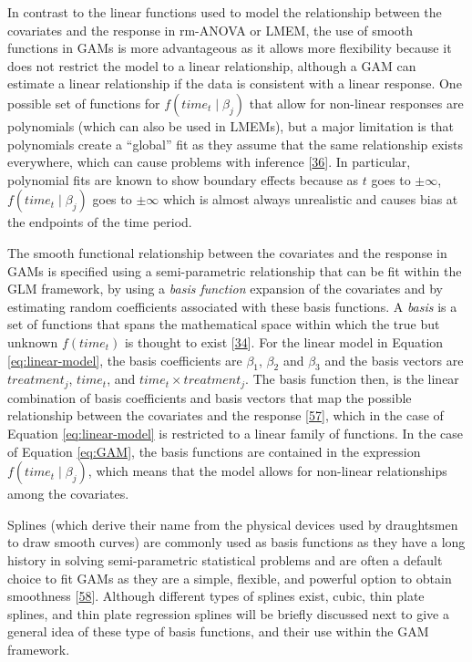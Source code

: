 \documentclass[
]{article}
\begin{document}
In contrast to the linear functions used to model the relationship between the covariates and the response in rm-ANOVA or LMEM, the use of smooth functions in GAMs is more advantageous as it allows more flexibility because it does not restrict the model to a linear relationship, although a GAM can estimate a linear relationship if the data is consistent with a linear response. One possible set of functions for \(f(time_t\mid \beta_j)\) that allow for non-linear responses are polynomials (which can also be used in LMEMs), but a major limitation is that polynomials create a ``global'' fit as they assume that the same relationship exists everywhere, which can cause problems with inference {[}\protect\hyperlink{ref-beck1998}{36}{]}. In particular, polynomial fits are known to show boundary effects because as \(t\) goes to \(\pm \infty\), \(f(time_t \mid \beta_j)\) goes to \(\pm \infty\) which is almost always unrealistic and causes bias at the endpoints of the time period.

The smooth functional relationship between the covariates and the response in GAMs is specified using a semi-parametric relationship that can be fit within the GLM framework, by using a \emph{basis function} expansion of the covariates and by estimating random coefficients associated with these basis functions. A \emph{basis} is a set of functions that spans the mathematical space within which the true but unknown \(f(time_t)\) is thought to exist {[}\protect\hyperlink{ref-simpson2018}{34}{]}. For the linear model in Equation \eqref{eq:linear-model}, the basis coefficients are \(\beta_1\), \(\beta_2\) and \(\beta_3\) and the basis vectors are \(treatment_j\), \(time_t\), and \(time_t \times treatment_j\). The basis function then, is the linear combination of basis coefficients and basis vectors that map the possible relationship between the covariates and the response {[}\protect\hyperlink{ref-hefley2017}{57}{]}, which in the case of Equation \eqref{eq:linear-model} is restricted to a linear family of functions. In the case of Equation \eqref{eq:GAM}, the basis functions are contained in the expression \(f(time_t\mid \beta_j)\), which means that the model allows for non-linear relationships among the covariates.

Splines (which derive their name from the physical devices used by draughtsmen to draw smooth curves) are commonly used as basis functions as they have a long history in solving semi-parametric statistical problems and are often a default choice to fit GAMs as they are a simple, flexible, and powerful option to obtain smoothness {[}\protect\hyperlink{ref-wegman1983}{58}{]}. Although different types of splines exist, cubic, thin plate splines, and thin plate regression splines will be briefly discussed next to give a general idea of these type of basis functions, and their use within the GAM framework.
\end{document}
